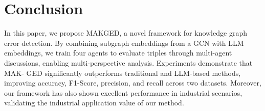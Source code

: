 \section{Conclusion}

In this paper, we propose MAKGED, a novel framework for knowledge graph error detection. 
% 
By combining subgraph embeddings from a GCN with LLM embeddings, we train four agents to evaluate triples through multi-agent discussions, enabling multi-perspective analysis. Experiments demonstrate that MAK-
GED significantly outperforms traditional and LLM-based methods, improving accuracy, F1-Score, precision, and recall across two datasets. Moreover, our framework has also shown excellent performance in industrial scenarios, validating the industrial application value of our method.

